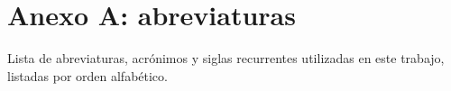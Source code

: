 \FormatoAnexo

\AddLabelsAxUno

\chapter*{Anexo A: abreviaturas}

	\noindent Lista de abreviaturas, acrónimos y siglas recurrentes utilizadas en este trabajo, listadas por orden alfabético.

    \glsaddall
    \printglossary[type=\acronymtype]

    
\thispagestyle{backmatter}